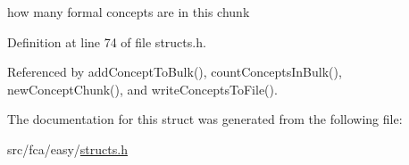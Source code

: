 how many formal concepts are in this chunk 



\-Definition at line 74 of file structs.\-h.



\-Referenced by add\-Concept\-To\-Bulk(), count\-Concepts\-In\-Bulk(), new\-Concept\-Chunk(), and write\-Concepts\-To\-File().



\-The documentation for this struct was generated from the following file\-:\begin{DoxyCompactItemize}
\item 
src/fca/easy/\hyperlink{easy_2structs_8h}{structs.\-h}\end{DoxyCompactItemize}
